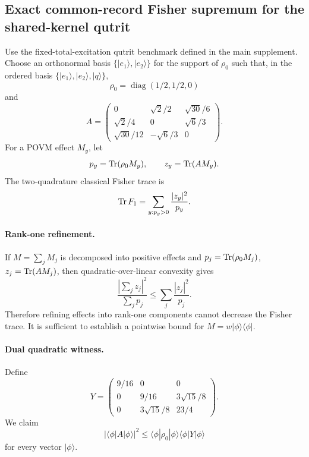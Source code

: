 
\subsection{Exact common-record Fisher supremum for the shared-kernel qutrit}
\label{supp:wp15-exact}

Use the fixed-total-excitation qutrit benchmark defined in the main supplement. Choose an orthonormal basis $\{|e_1\rangle,|e_2\rangle\}$ for the support of $\rho_0$ such that, in the ordered basis $\{|e_1\rangle,|e_2\rangle,|q\rangle\}$,
\begin{equation}
\rho_0=\operatorname{diag}(1/2,1/2,0)
\end{equation}
and
\begin{equation}
A=
\begin{pmatrix}
0 & \sqrt2/2 & \sqrt{30}/6\\
\sqrt2/4 & 0 & \sqrt6/3\\
\sqrt{30}/12 & -\sqrt6/3 & 0
\end{pmatrix}.
\label{eq:wp15-A}
\end{equation}
For a POVM effect $M_y$, let
\begin{equation}
p_y=\operatorname{Tr}(\rho_0M_y),\qquad z_y=\operatorname{Tr}(AM_y).
\end{equation}
The two-quadrature classical Fisher trace is
\begin{equation}
\operatorname{Tr} F_1=\sum_{y:p_y>0}\frac{|z_y|^2}{p_y}.
\end{equation}

\paragraph{Rank-one refinement.}
If $M=\sum_jM_j$ is decomposed into positive effects and $p_j=\operatorname{Tr}(\rho_0M_j)$, $z_j=\operatorname{Tr}(AM_j)$, then quadratic-over-linear convexity gives
\begin{equation}
\frac{|\sum_jz_j|^2}{\sum_jp_j}
\le\sum_j\frac{|z_j|^2}{p_j}.
\end{equation}
Therefore refining effects into rank-one components cannot decrease the Fisher trace. It is sufficient to establish a pointwise bound for $M=w|\phi\rangle\langle\phi|$.

\paragraph{Dual quadratic witness.}
Define
\begin{equation}
Y=
\begin{pmatrix}
9/16 & 0 & 0\\
0 & 9/16 & 3\sqrt{15}/8\\
0 & 3\sqrt{15}/8 & 23/4
\end{pmatrix}.
\label{eq:wp15-Y}
\end{equation}
We claim
\begin{equation}
|\langle\phi|A|\phi\rangle|^2
\le
\langle\phi|\rho_0|\phi\rangle
\langle\phi|Y|\phi\rangle
\label{eq:wp15-witness}
\end{equation}
for every vector $|\phi\rangle$.

